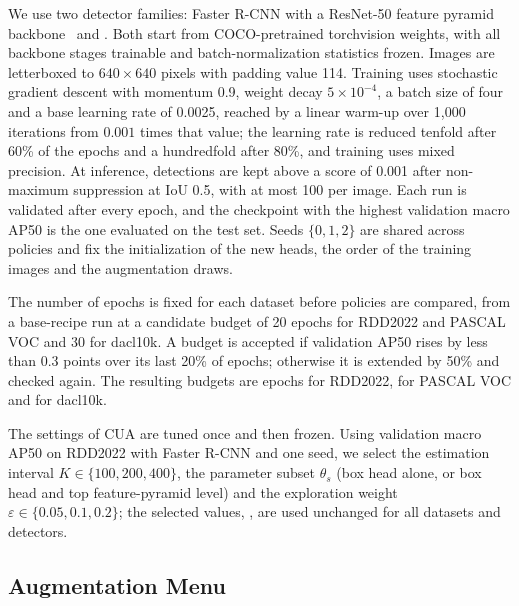 We use two detector families: Faster R-CNN with a ResNet-50 feature pyramid backbone~\cite{ren2017faster} and . Both start from COCO-pretrained torchvision weights, with all backbone stages trainable and batch-normalization statistics frozen. Images are letterboxed to $640\times640$ pixels with padding value 114. Training uses stochastic gradient descent with momentum 0.9, weight decay $5\times10^{-4}$, a batch size of four and a base learning rate of 0.0025, reached by a linear warm-up over 1,000 iterations from $0.001$ times that value; the learning rate is reduced tenfold after 60\% of the epochs and a hundredfold after 80\%, and training uses mixed precision. At inference, detections are kept above a score of 0.001 after non-maximum suppression at IoU 0.5, with at most 100 per image. Each run is validated after every epoch, and the checkpoint with the highest validation macro AP50 is the one evaluated on the test set. Seeds $\{0,1,2\}$ are shared across policies and fix the initialization of the new heads, the order of the training images and the augmentation draws.

The number of epochs is fixed for each dataset before policies are compared, from a base-recipe run at a candidate budget of 20 epochs for RDD2022 and PASCAL VOC and 30 for dacl10k. A budget is accepted if validation AP50 rises by less than 0.3 points over its last 20\% of epochs; otherwise it is extended by 50\% and checked again. The resulting budgets are  epochs for RDD2022,  for PASCAL VOC and  for dacl10k.

The settings of CUA are tuned once and then frozen. Using validation macro AP50 on RDD2022 with Faster R-CNN and one seed, we select the estimation interval $K\in\{100,200,400\}$, the parameter subset $\theta_s$ (box head alone, or box head and top feature-pyramid level) and the exploration weight $\varepsilon\in\{0.05,0.1,0.2\}$; the selected values, , are used unchanged for all datasets and detectors.

\subsection{Augmentation Menu}
\label{sec:setup_menu}

